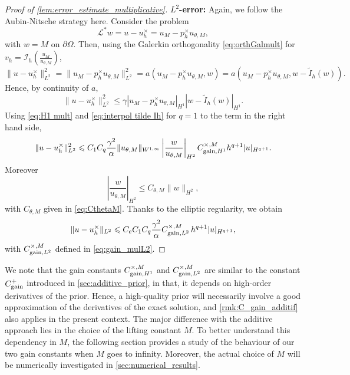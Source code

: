 \begin{proof}[Proof of \cref{lem:error_estimate_multiplicative}]
	\textbf{$L^2$-error:}
	Again, we follow the Aubin-Nitsche strategy here. Consider the problem
	$$\mathcal{L}^*w=u-u_h^{\times}=u_M-p_h^{\times}u_{\theta,M},$$
	with $w=M$ on $\partial\Omega$. Then,  using the Galerkin orthogonality \eqref{eq:orthGalmult} for $v_h=\mathcal{I}_h\left(\frac{u_M}{u_{\theta,M}}\right)$,
	$$\|u-u_h^{\times}\|_{L^2}^2
		=\|u_M-p_h^{\times}u_{\theta,M}\|_{L^2}^2
		=a(u_M-p_h^{\times}u_{\theta,M},w)
		=a(u_M-p_h^{\times}u_{\theta,M},w-\tilde I_h(w)).$$
    Hence, by continuity of $a$,
	$$\|u-u_h^{\times}\|_{L^2}^2 \leqslant \gamma |u_M-p_h^{\times}u_{\theta,M}|_{H^1}|w-\tilde I_h(w)|_{H^1}.$$
Using \eqref{eq:H1 mult} and \eqref{eq:interpol tilde Ih} for $q=1$ to the term in the right hand side,
	\begin{equation*}
		\|u-u_h^{\times}\|_{L^2}^2
		\leqslant C_1 C_q \dfrac{\gamma^2}{\alpha} \|u_{\theta,M}\|_{W^{1,\infty}} \left|\frac{w}{u_{\theta,M}}\right|_{H^{2}} C_{\text{\rm gain},H^1}^{\times,M} h^{q+1}| u |_{H^{q+1}}.
	\end{equation*}
   Moreover
    $$\left|\frac{w}{u_{\theta,M}}\right|_{H^{2}}\leqslant C_{\theta,M}\|w\|_{H^{2}},$$
    with $C_{\theta,M}$ given in \eqref{eq:CthetaM}.
 Thanks to the elliptic regularity, we obtain
    \begin{equation*}
        \| u-u_h^\times\|_{L^2} \leqslant C_e C_1 C_q\dfrac{\gamma^2}{\alpha} C_{\text{\rm gain},L^2}^{\times,M} \, h^{q+1} |u|_{H^{q+1}},
    \end{equation*}
with $C_{\text{\rm gain},L^2}^{\times,M}$ defined in \eqref{eq:gain_mulL2}.
\end{proof}

\begin{remark}
	\label{rmk:C_gain_multiplicatif}
	We note that the gain constants $C_{\text{\rm gain},H^1}^{\times,M}$ and $C_{\text{\rm gain},L^2}^{\times,M}$
	are similar to the constant $C_\text{\rm gain}^+$
	introduced in \cref{sec:additive_prior},
	in that, it depends on high-order derivatives of the prior.
	Hence, a high-quality prior will necessarily involve
	a good approximation of the derivatives of the exact solution,
	and \cref{rmk:C_gain_additif} also applies in the present context.
	The major difference with the additive approach lies
	in the choice of the lifting constant $M$.
	To better understand this dependency in $M$,
	the following section provides a
	study of the behaviour of our two gain constants
	when $M$ goes to infinity.
	Moreover, the actual choice of $M$ will be
	numerically investigated in \cref{sec:numerical_results}.
\end{remark}

